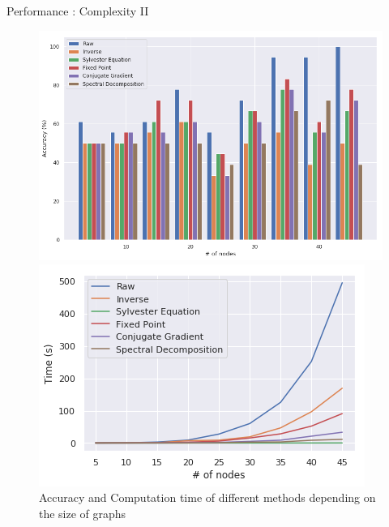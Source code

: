 \documentclass[compress]{beamer}
\begin{document}
\begin{frame}{Performance : Complexity II}
\begin{figure}[!htb]
	\begin{multicols}{2}
		\includegraphics[width=\linewidth]{data/nb_nodes/acc.png}\par
		\includegraphics[width=\linewidth]{data/nb_nodes/time.png}\par
	\end{multicols}
	\caption*{Accuracy and Computation time of different methods depending on the size of graphs}
\end{figure}
\end{frame}
\end{document}
